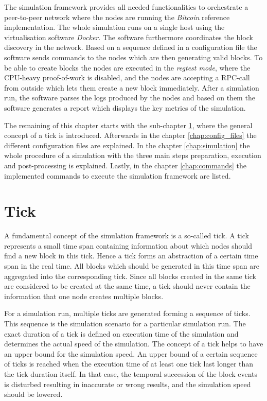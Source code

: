 The simulation framework provides all needed functionalities to orchestrate a peer-to-peer network where the nodes are running the \textit{Bitcoin} reference implementation.
The whole simulation runs on a single host using the virtualisation software \textit{Docker}.
The software furthermore coordinates the block discovery in the network.
Based on a sequence defined in a configuration file the software sends commands to the nodes which are then generating valid blocks.
To be able to create blocks the nodes are executed in the \textit{regtest mode}, where the CPU-heavy proof-of-work is disabled, and the nodes are accepting a RPC-call from outside which lets them create a new block immediately.
After a simulation run, the software parses the logs produced by the nodes and based on them the software generates a report which displays the key metrics of the simulation.

The remaining of this chapter starts with the sub-chapter \ref{chap:tick}, where the general concept of a tick is introduced.
Afterwards in the chapter \ref{chap:config_files} the different configuration files are explained.
In the chapter \ref{chap:simulation} the whole procedure of a simulation with the three main steps preparation, execution and post-processing is explained.
Lastly, in the chapter \ref{chap:commands} the implemented commands to execute the simulation framework are listed.
  
\section{Tick}
\label{chap:tick}

A fundamental concept of the simulation framework is a so-called tick.
A tick represents a small time span containing information about which nodes should find a new block in this tick.
Hence a tick forms an abstraction of a certain time span in the real time.
All blocks which should be generated in this time span are aggregated into the corresponding tick.
Since all blocks created in the same tick are considered to be created at the same time, a tick should never contain the information that one node creates multiple blocks.

For a simulation run, multiple ticks are generated forming a sequence of ticks.
This sequence is the simulation scenario for a particular simulation run.
The exact duration of a tick is defined on execution time of the simulation and determines the actual speed of the simulation.
The concept of a tick helps to have an upper bound for the simulation speed.
An upper bound of a certain sequence of ticks is reached when the execution time of at least one tick last longer than the tick duration itself.
In that case, the temporal succession of the block events is disturbed resulting in inaccurate or wrong results, and the simulation speed should be lowered.

